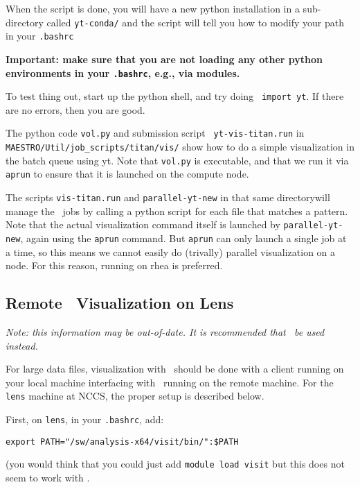 When the script is done, you will have a new python installation in a sub-directory
called {\tt yt-conda/} and the script will tell you how to modify your path
in your {\tt .bashrc}

{\bfseries Important: make sure that you are not loading any other
  python environments in your {\tt .bashrc}, e.g., via modules.}

To test thing out, start up the python shell, and try doing {\tt
  import yt}.  If there are no errors, then you are good.

The python code {\tt vol.py} and submission script {\tt
  yt-vis-titan.run} in {\tt MAESTRO/Util/job\_scripts/titan/vis/} show
how to do a simple visualization in the batch queue using yt.  Note
that {\tt vol.py} is executable, and that we run it via {\tt aprun} to
ensure that it is launched on the compute node.

The scripts {\tt vis-titan.run} and {\tt parallel-yt-new} in that
same directorywill manage the \yt\ jobs by calling a
python script for each file that matches a pattern.  
Note that the actual visualization command itself is launched by
{\tt parallel-yt-new}, again using the {\tt aprun} command.  But
{\tt aprun} can only launch a single job at a time, so this means
we cannot easily do (trivally) parallel visualization on a node.  For
this reason, running on rhea is preferred.


\subsection{Remote \visit\ Visualization on Lens}

{\em Note: this information may be out-of-date.  It is recommended that
 \yt\ be used instead.}

For large data files, visualization with \visit\ should be done with
a client running on your local machine interfacing with \visit\ running
on the remote machine.  For the {\tt lens} machine at NCCS, the proper setup
is described below.

First, on {\tt lens}, in your {\tt .bashrc}, add:
\begin{verbatim}
export PATH="/sw/analysis-x64/visit/bin/":$PATH
\end{verbatim}
(you would think that you could just add {\tt module load visit} but this
does not seem to work with \visit.

